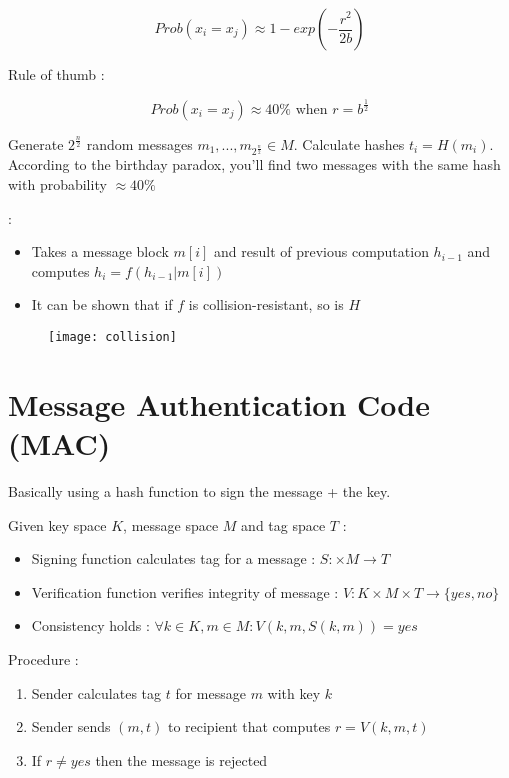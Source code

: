 \[
Prob(x_i = x_j) \approx 1 - exp(-\frac{r^2}{2b})
\]

Rule of thumb :

\[
Prob(x_i = x_j) \approx 40\% \text{ when } r = b^{\frac{1}{2}}
\]

Generate $2^{\frac{n}{2}}$ random messages $m_1, ..., m_{2^{\frac{n}{2}}} \in M$. Calculate hashes $t_i = H(m_i)$. According to the birthday paradox, you'll find two messages with the same hash with probability $\approx 40\%$

 :
\begin{itemize}
    \item Takes a message block $m[i]$ and result of previous computation $h_{i-1}$ and computes $h_i = f(h_{i-1}|m[i])$
    \item It can be shown that if $f$ is collision-resistant, so is $H$
\end{itemize}

\begin{figure}[H]
    \centering
    \texttt{[image: collision]}
\end{figure}

\chapter{Message Authentication Code (MAC)}

Basically using a hash function to sign the message + the key.

Given key space $K$, message space $M$ and tag space $T$ :
\begin{itemize}
    \item Signing function calculates tag for a message : $S : \times M \rightarrow T$
    \item Verification function verifies integrity of message : $V : K \times M \times T \rightarrow \{yes, no\}$
    \item Consistency holds : $\forall k \in K, m \in M : V(k, m, S(k, m)) = yes$
\end{itemize}

Procedure :
\begin{enumerate}
    \item Sender calculates tag $t$ for message $m$ with key $k$
    \item Sender sends $(m, t)$ to recipient that computes $r=V(k, m, t)$
    \item If $r \neq yes$ then the message is rejected
\end{enumerate}

